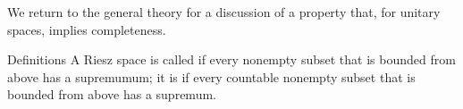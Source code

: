 \documentclass[main.tex]{subfiles}
\begin{document}
%
%
\noindent We return to the general theory
for a discussion of a property that,
for unitary spaces,
implies completeness.
\begin{psec}{4.16}{Definitions}
A Riesz space is called 
if every nonempty subset that is bounded from above
has a supremumum;
it is 
if every countable nonempty subset
that is bounded from above
has a supremum.
\end{psec}
\clearpage
\end{document}
